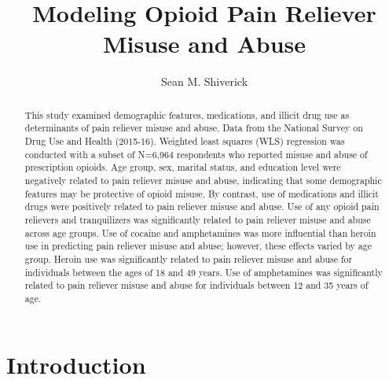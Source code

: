 \documentclass[sigconf]{acmart}
\begin{document}
\title{Modeling Opioid Pain Reliever Misuse and Abuse}

  \author{Sean M. Shiverick}

\renewcommand{\shortauthors}{S.M. Shiverick}


\begin{abstract}
This study examined demographic features, medications, and illicit drug use 
as determinants of pain reliever misuse and abuse. Data from the National 
Survey on Drug Use and Health (2015-16). Weighted least squares (WLS) regression
was conducted with a subset of N=6,964 respondents who reported misuse and abuse 
of prescription opioids. Age group, sex, marital status, and education
level were negatively related to pain reliever misuse and abuse, indicating that
some demographic features may be protective of opioid misuse. By contrast, use of 
medications and illicit drugs were positively related to pain reliever misuse 
and abuse. Use of any opioid pain relievers and tranquilizers was significantly
related to pain reliever misuse and abuse across age groups. Use of cocaine and 
amphetamines was more influential than heroin use in predicting pain reliever 
misuse and abuse; however, these effects varied by age group. Heroin use was 
significantly related to pain reliever misuse and abuse for individuals between 
the ages of 18 and 49 years. Use of amphetamines was significantly related to 
pain reliever misuse and abuse for individuals between 12 and 35 years of age. 
\end{abstract}


\maketitle

\section{Introduction}
\end{document}
